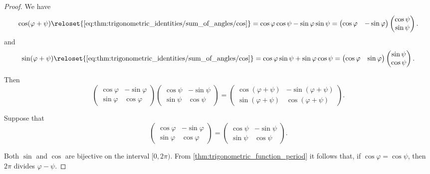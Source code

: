 \begin{proof}
   We have
  \begin{equation*}
    \cos(\varphi + \psi)
    \reloset {\eqref{eq:thm:trigonometric_identities/sum_of_angles/cos}} =
    \cos \varphi \cos \psi - \sin \varphi \sin \psi
    =
    \begin{pmatrix}
      \cos \varphi & -\sin \varphi
    \end{pmatrix}
    \begin{pmatrix}
      \cos \psi \\ \sin \psi
    \end{pmatrix}.
  \end{equation*}
  and
  \begin{equation*}
    \sin(\varphi + \psi)
    \reloset {\eqref{eq:thm:trigonometric_identities/sum_of_angles/cos}} =
    \cos \varphi \sin \psi + \sin \varphi \cos \psi
    =
    \begin{pmatrix}
      \cos \varphi & \sin \varphi
    \end{pmatrix}
    \begin{pmatrix}
      \sin \psi \\ \cos \psi
    \end{pmatrix}.
  \end{equation*}

  Then
  \begin{equation*}
    \begin{pmatrix}
      \cos \varphi & -\sin \varphi \\
      \sin \varphi & \cos \varphi
    \end{pmatrix}
    \begin{pmatrix}
      \cos \psi & -\sin \psi \\
      \sin \psi & \cos \psi
    \end{pmatrix}
    =
    \begin{pmatrix}
      \cos (\varphi + \psi) & -\sin (\varphi + \psi) \\
      \sin (\varphi + \psi) & \cos (\varphi + \psi)
    \end{pmatrix}.
  \end{equation*}

   Suppose that
  \begin{equation*}
    \begin{pmatrix}
      \cos \varphi & -\sin \varphi \\
      \sin \varphi & \cos \varphi
    \end{pmatrix}
    =
    \begin{pmatrix}
      \cos \psi & -\sin \psi \\
      \sin \psi & \cos \psi
    \end{pmatrix}.
  \end{equation*}

  Both \( \sin \) and \( \cos \) are bijective on the interval \( [0, 2\pi) \). From \cref{thm:trigonometric_function_period} it follows that, if \( \cos \varphi = \cos \psi \), then \( 2\pi \) divides \( \varphi - \psi \).
\end{proof}

